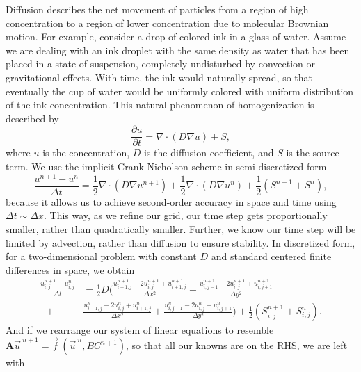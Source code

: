 \documentclass[oneside,12pt,final]{/Applications/TeX/packages/ucthesis-CA2012}
\begin{document}
\begin{mainmatter}
Diffusion describes the net movement of particles from a region of high concentration to a region of lower concentration due to molecular Brownian motion. For example, consider a drop of colored ink in a glass of water. Assume we are dealing with an ink droplet with the same density as water that has been placed in a state of suspension, completely undisturbed by convection or gravitational effects. With time, the ink would naturally spread, so that eventually the cup of water would be uniformly colored with uniform distribution of the ink concentration. This natural phenomenon of homogenization is described by
\begin{equation}\label{eqn:diffusion}
\frac{\partial u}{\partial t} = \nabla \cdot (D \nabla u) + S,
\end{equation}
where $u$ is the concentration, $D$ is the diffusion coefficient, and $S$ is the source term. We use the implicit Crank-Nicholson scheme in semi-discretized form
\begin{equation}\label{eqn:Crank}
\frac{u^{n+1}-u^n}{\Delta t} = \frac{1}{2}\nabla \cdot (D \nabla u^{n+1}) + \frac{1}{2}\nabla \cdot (D \nabla u^{n}) + \frac{1}{2}(S^{n+1}+S^{n}),
\end{equation}
because it allows us to achieve second-order accuracy in space and time using $\Delta t \sim \Delta x$. This way, as we refine our grid, our time step gets proportionally smaller, rather than quadratically smaller. Further, we know our time step will be limited by advection, rather than diffusion to ensure stability. In discretized form, for a two-dimensional problem with constant $D$ and standard centered finite differences in space, we obtain
\begin{equation}
\begin{aligned}
\frac{u_{i,j}^{n+1} - u_{i,j}^{n}}{\Delta t} &= \frac{1}{2}D  \bigg(\frac{u_{i-1,j}^{n+1} - 2u_{i,j}^{n+1} +  u_{i+1,j}^{n+1}}{\Delta x^2} + \frac{u_{i,j-1}^{n+1} - 2u_{i,j}^{n+1} + u_{i,j+1}^{n+1}}{\Delta y^2}\\
\>\>\>+ 
&\frac{u_{i-1,j}^{n} - 2u_{i,j}^{n} + u_{i+1,j}^{n}}{\Delta x^2} + \frac{u_{i,j-1}^{n} - 2u_{i,j}^{n} + u_{i,j+1}^{n}}{\Delta y^2}\bigg)
+ \frac{1}{2}(S_{i,j}^{n+1} + S_{i,j}^{n}).
\end{aligned}
\end{equation}
And if we rearrange our system of linear equations to resemble $\boldsymbol{A}\vec{u}^{\>n+1} = \vec{f}\>(\vec{u}^{\>n},BC^{n+1})$, so that all our knowns are on the RHS, we are left with
\begin{equation}\label{eqn:Crank_discretized}

\end{equation}
\end{mainmatter}
\end{document}
